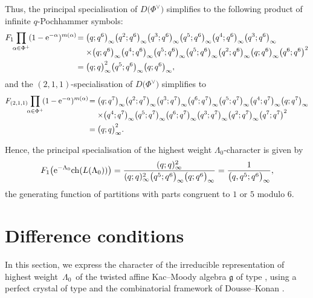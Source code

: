 \documentclass[pdftex]{sigma}
\numberwithin{equation}{section}
\theoremstyle{definition}
\begin{document}
Thus, the principal specialisation of $D\bigl(\Phi^\vee\bigr)$ simplifies to the following product of infinite $q$-Pochhammer symbols:
\begin{align*}
F_1\!\! \prod_{\alpha \in \Phi^+}\! (1 - {\rm e}^{-\alpha} )^{m(\alpha)}\!
={}&
\bigl(q;q^6\bigr)_{\infty} \bigl(q^2;q^6\bigr)_{\infty} \bigl(q^3;q^6\bigr)_{\infty} \bigl(q^5;q^6\bigr)_{\infty} \bigl(q^4;q^6\bigr)_{\infty} \bigl(q^3;q^6\bigr)_{\infty} \\[-2.3ex]
&{}{\times}  \bigl(q;q^6\bigr)_{\infty} \bigl(q^4;q^6\bigr)_{\infty} \bigl(q^5;q^6\bigr)_{\infty} \bigl(q^5;q^6\bigr)_{\infty} \bigl(q^2;q^6\bigr)_{\infty} \bigl(q;q^6\bigr)_{\infty} \bigl(q^6;q^6\bigr)^2 \\
={}&
\bigl(q;q\bigr)_{\infty}^2 \bigl(q^5;q^6\bigr)_{\infty} \bigl(q;q^6\bigr)_{\infty},
\end{align*}
and the $(2,1,1)$-specialisation of $D\bigl(\Phi^\vee\bigr)$ simplifies to
\begin{align*}
F_{(2,1,1)}\!\! \prod_{\alpha \in \Phi^+}\! (1 - {\rm e}^{-\alpha})^{m(\alpha)}
\!={}&
\bigl(q;q^7\bigr)_{\infty} \bigl(q^2;q^7\bigr)_{\infty} \bigl(q^3;q^7\bigr)_{\infty} \bigl(q^6;q^7\bigr)_{\infty} \bigl(q^5;q^7\bigr)_{\infty} \bigl(q^4;q^7\bigr)_{\infty} \bigl(q;q^7\bigr)_{\infty} \\[-2.3ex]
&{}{\times}  \bigl(q^4;q^7\bigr)_{\infty} \bigl(q^5;q^7\bigr)_{\infty} \bigl(q^6;q^7\bigr)_{\infty} \bigl(q^3;q^7\bigr)_{\infty} \bigl(q^2;q^7\bigr)_{\infty} \bigl(q^7;q^7\bigr)^2 \\
={}&
\bigl(q;q\bigr)_{\infty}^2.
\end{align*}

Hence, the principal specialisation of the highest weight $\Lambda_0$-character is given by
\begin{align}\label{eq:cong_cond}
 F_1\bigl({\rm e}^{-\Lambda_0}\mathrm{ch} (L(\Lambda_0) )\bigr) = \frac{(q;q)_{\infty}^2}{(q;q)_{\infty}^2\bigl(q^5;q^6\bigr)_{\infty}\bigl(q;q^6\bigr)_{\infty}}= \frac{1}{\bigl(q,q^5;q^6\bigr)_{\infty}},
\end{align}
the generating function of partitions with parts congruent to $1$ or $5$ modulo $6$.

\section{Difference conditions}\label{section:difference}

In this section, we express the character of the irreducible representation of highest weight~$\Lambda_0$~of the twisted affine Kac--Moody algebra $\mathfrak{g}$ of type , using a perfect crystal of type  and the combinatorial framework of Dousse--Konan \cite{DK19b,DK22}.
\end{document}

